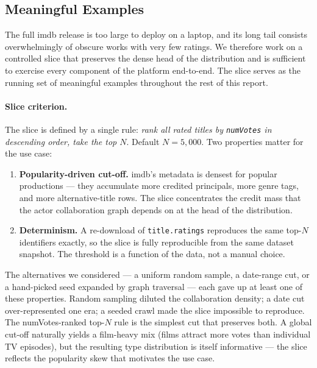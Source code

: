 \subsection{Meaningful Examples}
\label{subsec:meaningful-examples}

The full \ac{imdb} release is too large to deploy on a laptop, and its long tail consists overwhelmingly of obscure works with very few ratings. We therefore work on a controlled slice that preserves the dense head of the distribution and is sufficient to exercise every component of the platform end-to-end. The slice serves as the running set of meaningful examples throughout the rest of this report.

\paragraph{Slice criterion.} The slice is defined by a single rule: \emph{rank all rated titles by \texttt{numVotes} in descending order, take the top $N$}. Default $N = 5{,}000$. Two properties matter for the use case:

\begin{enumerate}
\item \textbf{Popularity-driven cut-off.} \ac{imdb}'s metadata is densest for popular productions --- they accumulate more credited principals, more genre tags, and more alternative-title rows. The slice concentrates the credit mass that the actor collaboration graph depends on at the head of the distribution.
\item \textbf{Determinism.} A re-download of \texttt{title.ratings} reproduces the same top-$N$ identifiers exactly, so the slice is fully reproducible from the same dataset snapshot. The threshold is a function of the data, not a manual choice.
\end{enumerate}

The alternatives we considered --- a uniform random sample, a date-range cut, or a hand-picked seed expanded by graph traversal --- each gave up at least one of these properties. Random sampling diluted the collaboration density; a date cut over-represented one era; a seeded crawl made the slice impossible to reproduce. The numVotes-ranked top-$N$ rule is the simplest cut that preserves both. A global cut-off naturally yields a film-heavy mix (films attract more votes than individual TV episodes), but the resulting type distribution is itself informative --- the slice reflects the popularity skew that motivates the use case.

